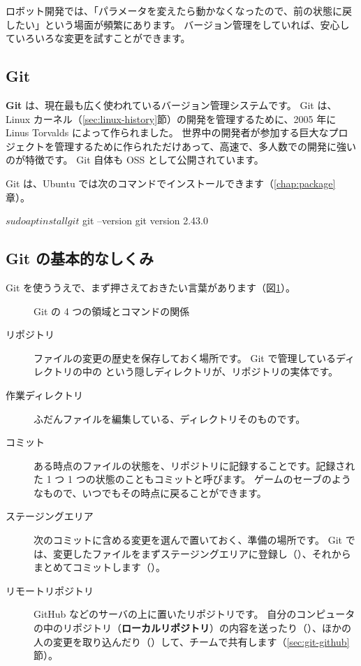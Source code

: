 ロボット開発では、「パラメータを変えたら動かなくなったので、前の状態に戻したい」という場面が頻繁にあります。
バージョン管理をしていれば、安心していろいろな変更を試すことができます。

\subsection{Git}

\textbf{Git} は、現在最も広く使われているバージョン管理システムです。
Git は、Linux カーネル（\ref{sec:linux-history}節）の開発を管理するために、2005 年に Linus Torvalds によって作られました。
世界中の開発者が参加する巨大なプロジェクトを管理するために作られただけあって、高速で、多人数での開発に強いのが特徴です。
Git 自体も OSS として公開されています。

Git は、Ubuntu では次のコマンドでインストールできます（\ref{chap:package}章）。

\begin{terminal}
$ sudo apt install git
$ git --version
git version 2.43.0
\end{terminal}

\subsection{Git の基本的なしくみ}

Git を使ううえで、まず押さえておきたい言葉があります（図\ref{fig:git-areas}）。

\begin{figure}[tb]
  \centering
  
  \caption{Git の 4 つの領域とコマンドの関係}
  \label{fig:git-areas}
\end{figure}

\begin{description}
  \item[リポジトリ]
    ファイルの変更の歴史を保存しておく場所です。
    Git で管理しているディレクトリの中の  という隠しディレクトリが、リポジトリの実体です。
  \item[作業ディレクトリ]
    ふだんファイルを編集している、ディレクトリそのものです。
  \item[コミット]
    ある時点のファイルの状態を、リポジトリに記録することです。記録された 1 つ 1 つの状態のこともコミットと呼びます。
    ゲームのセーブのようなもので、いつでもその時点に戻ることができます。
  \item[ステージングエリア]
    次のコミットに含める変更を選んで置いておく、準備の場所です。
    Git では、変更したファイルをまずステージングエリアに登録し（）、それからまとめてコミットします（）。
  \item[リモートリポジトリ]
    GitHub などのサーバの上に置いたリポジトリです。
    自分のコンピュータの中のリポジトリ（\textbf{ローカルリポジトリ}）の内容を送ったり（）、ほかの人の変更を取り込んだり（）して、チームで共有します（\ref{sec:git-github}節）。
\end{description}

